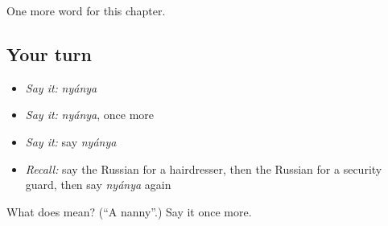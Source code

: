 \begin{grammarlens}[title={What you've built}]
One more word for this chapter.
\end{grammarlens}

\subsection*{Your turn}
\begin{itemize}
\raggedright
  \item \emph{Say it:} \emph{nyánya}
  \item \emph{Say it:} \emph{nyánya}, once more
  \item \emph{Say it:} say \emph{nyánya}
  \item \emph{Recall:} say the Russian for a hairdresser, then the Russian for a security guard, then say \emph{nyánya} again
\end{itemize}

\begin{tcolorbox}[breakable,colback=teal!4,colframe=teal!35!black,title={Before you move on}]
What does  mean? (\textquotedblleft{}A nanny\textquotedblright{}.) Say it once more.
\end{tcolorbox}
